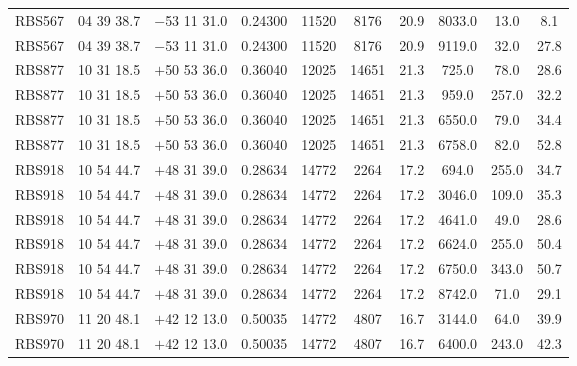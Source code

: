 \begin{landscape}
\begin{center}
\begin{longtable}{l c c c c c c c c c}
RBS567  &                  04 39 38.7  &         $-$53 11 31.0  &       0.24300  & 11520  &   8176  &       20.9  &      8033.0  &  13.0  &   8.1  \\
RBS567  &                  04 39 38.7  &         $-$53 11 31.0  &       0.24300  & 11520  &   8176  &       20.9  &      9119.0  &  32.0  &   27.8  \\
RBS877  &                  10 31 18.5  &         $+$50 53 36.0  &       0.36040  & 12025  &   14651  &      21.3  &      725.0  &   78.0  &   28.6  \\
RBS877  &                  10 31 18.5  &         $+$50 53 36.0  &       0.36040  & 12025  &   14651  &      21.3  &      959.0  &   257.0  &  32.2  \\
RBS877  &                  10 31 18.5  &         $+$50 53 36.0  &       0.36040  & 12025  &   14651  &      21.3  &      6550.0  &  79.0  &   34.4  \\
RBS877  &                  10 31 18.5  &         $+$50 53 36.0  &       0.36040  & 12025  &   14651  &      21.3  &      6758.0  &  82.0  &   52.8  \\
RBS918  &                  10 54 44.7  &         $+$48 31 39.0  &       0.28634  & 14772  &   2264  &       17.2  &      694.0  &   255.0  &  34.7  \\
RBS918  &                  10 54 44.7  &         $+$48 31 39.0  &       0.28634  & 14772  &   2264  &       17.2  &      3046.0  &  109.0  &  35.3  \\
RBS918  &                  10 54 44.7  &         $+$48 31 39.0  &       0.28634  & 14772  &   2264  &       17.2  &      4641.0  &  49.0  &   28.6  \\
RBS918  &                  10 54 44.7  &         $+$48 31 39.0  &       0.28634  & 14772  &   2264  &       17.2  &      6624.0  &  255.0  &  50.4  \\
RBS918  &                  10 54 44.7  &         $+$48 31 39.0  &       0.28634  & 14772  &   2264  &       17.2  &      6750.0  &  343.0  &  50.7  \\
RBS918  &                  10 54 44.7  &         $+$48 31 39.0  &       0.28634  & 14772  &   2264  &       17.2  &      8742.0  &  71.0  &   29.1  \\
RBS970  &                  11 20 48.1  &         $+$42 12 13.0  &       0.50035  & 14772  &   4807  &       16.7  &      3144.0  &  64.0  &   39.9  \\
RBS970  &                  11 20 48.1  &         $+$42 12 13.0  &       0.50035  & 14772  &   4807  &       16.7  &      6400.0  &  243.0  &  42.3  \\

\end{longtable}
\end{center}
\end{landscape}
